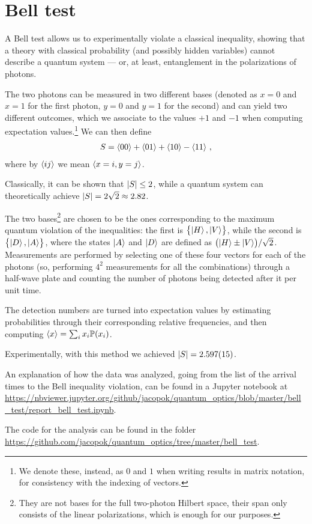 \documentclass[main.tex]{subfiles}
\begin{document}
\section{Bell test}

A Bell test allows us to experimentally violate a classical inequality, showing that a theory with classical probability (and possibly hidden variables) cannot describe a quantum system --- or, at least, entanglement in the polarizations of photons. 

The two photons can be measured in two different bases (denoted as \(x=0\) and \(x=1\) for the first photon, \(y=0\) and \(y=1\) for the second) and can yield two different outcomes, which we associate to the values \(+1\) and \(-1\) when computing expectation values.\footnote{We denote these, instead, as \(0\) and \(1\) when writing results in matrix notation, for consistency with the indexing of vectors.} We can then define 
%
\begin{align}
S = \expval{00} + \expval{01}+ \expval{10} - \expval{11}
\,,
\end{align}
%
where by \(\expval{ij}\) we mean \(\expval{x=i, y=j}\). 

Classically, it can be shown \cite[]{clauserProposedExperimentTest1969} that \(\abs{S} \leq 2\), while a quantum system can theoretically achieve \(\abs{S} = 2 \sqrt{2} \approx \num{2.82}\). 

The two bases\footnote{They are not bases for the full two-photon Hilbert space, their span only consists of the linear polarizations, which is enough for our purposes. } are chosen to be the ones corresponding to the maximum quantum violation of the inequalities: the first is \(\qty{\ket{H}, \ket{V}}\), while the second is \(\qty{\ket{D}, \ket{A}}\), where the states \(\ket{A}\) and \(\ket{D}\) are defined as \(\qty(\ket{H} \pm \ket{V}) / \sqrt{2}\). 
Measurements are performed by selecting one of these four vectors for each of the photons (so, performing \(4^2\) measurements for all the combinations) through a half-wave plate and counting the number of photons being detected after it per unit time. 

The detection numbers are turned into expectation values by estimating probabilities through their corresponding relative frequencies, and then computing \(\expval{x} = \sum_i x_i \mathbb{P}(x_i)\). 

Experimentally, with this method we achieved \(\abs{S} = \num{2.597(15)}\).

An explanation of how the data was analyzed, going from the list of the arrival times to the Bell inequality violation, can be found in a Jupyter notebook at \url{https://nbviewer.jupyter.org/github/jacopok/quantum_optics/blob/master/bell_test/report_bell_test.ipynb}.

The code for the analysis can be found in the folder \url{https://github.com/jacopok/quantum_optics/tree/master/bell_test}. 
\end{document}
